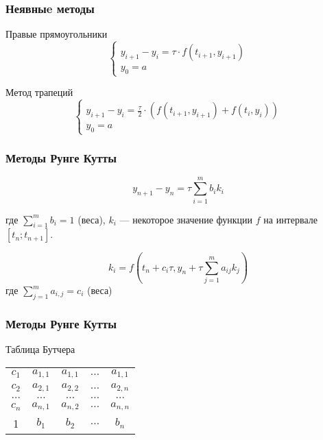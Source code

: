 \documentclass[10pt]{beamer}
\begin{document}
\begin{frame}[fragile]
\frametitle{Неявныe методы}

Правые прямоугольники
$$
\begin{cases}
y_{i + 1} - y_i = \tau \cdot f(t_{i+1}, y_{i+1}) \\
y_0 = a
\end{cases}
$$

Метод трапеций
$$
\begin{cases}
y_{i + 1} - y_i = \frac{\tau}{2} \cdot \left(f(t_{i+1}, y_{i+1}) + f(t_{i}, y_{i}) \right) \\
y_0 = a
\end{cases}
$$

\end{frame}

\begin{frame}[fragile]
\frametitle{Методы Рунге Кутты}

$$y_{n+1} - y_{n} = \tau \sum_{i=1}^{m} b_i k_i$$

где $\sum_{i=1}^{m} {b_i} = 1$ (веса), $k_i$ --- некоторое значение функции $f$ на интервале $[t_n; t_{n+1}]$.

$$k_i = f(t_n + c_i \tau, y_n + \tau \sum_{j = 1}^{m}{a_{ij}} k_j)$$
где $\sum_{j=1}^{m} {a_{i, j}} = c_i$ (веса)
\end{frame}


\begin{frame}[fragile]
\frametitle{Методы Рунге Кутты}
Таблица Бутчера

\begin{center}
\begin{tabular}{c|cccc}
$c_1$ & $a_{1,1}$ & $a_{1,1}$ & $\ldots$ & $a_{1,1}$ \\
$c_2$ & $a_{2,1}$ & $a_{2,2}$ & $\ldots$ & $a_{2,n}$ \\
$\ldots$ & $\ldots$ & $\ldots$ & $\ldots$ & $\ldots$ \\
$c_n$ & $a_{n,1}$ & $a_{n,2}$ & $\ldots$ & $a_{n,n}$ \\
\hline
1 & $b_{1}$ & $b_{2}$ & $\ldots$ & $b_{n}$ \\
\end{tabular}
\end{center}

\end{frame}
\end{document}
